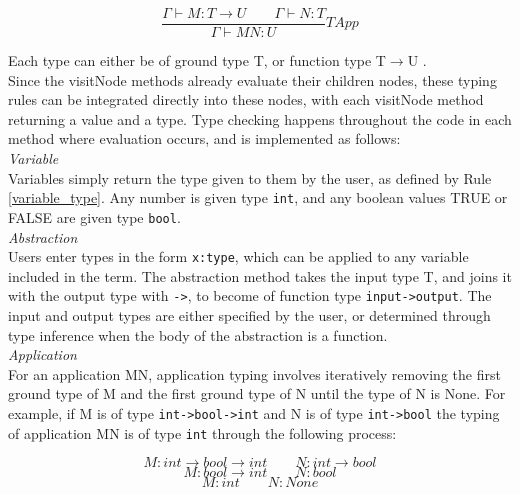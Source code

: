 \documentclass[a4paper,12pt]{report}
\begin{document}
\begin{equation*}
\frac{\Gamma \vdash M:T \to U \qquad \Gamma \vdash N:T}{\Gamma \vdash MN:U}TApp
\end{equation*}

Each type can either be of ground type T, or function type T$\rightarrow$U \cite{Hankin2004}.\\

Since the visitNode methods already evaluate their children nodes, these typing rules can be integrated directly into these nodes, with each visitNode method returning a value and a type. Type checking happens throughout the code in each method where evaluation occurs, and is implemented as follows:\\

\textit{Variable}\\
Variables simply return the type given to them by the user, as defined by Rule \ref{variable_type}. Any number is given type \texttt{int}, and any boolean values TRUE or FALSE are given type \texttt{bool}.\\

\textit{Abstraction}\\
Users enter types in the form \texttt{x:type}, which can be applied to any variable included in the term. The abstraction method takes the input type T, and joins it with the output type with \texttt{->}, to become of function type \texttt{input->output}. The input and output types are either specified by the user, or determined through type inference when the body of the abstraction is a function.\\

\textit{Application}\\
For an application MN, application typing involves iteratively removing the first ground type of M and the first ground type of N until the type of N is None. For example, if M is of type \texttt{int->bool->int} and N is of type \texttt{int->bool} the typing of application MN is of type \texttt{int} through the following process:

\begin{equation*}
M:int\rightarrow bool\rightarrow int \qquad N:int\rightarrow bool
\end{equation*}
\begin{equation*}
M:bool\rightarrow int \qquad N:bool
\end{equation*}
\begin{equation*}
M:int \qquad N:None
\end{equation*}
\end{document}
